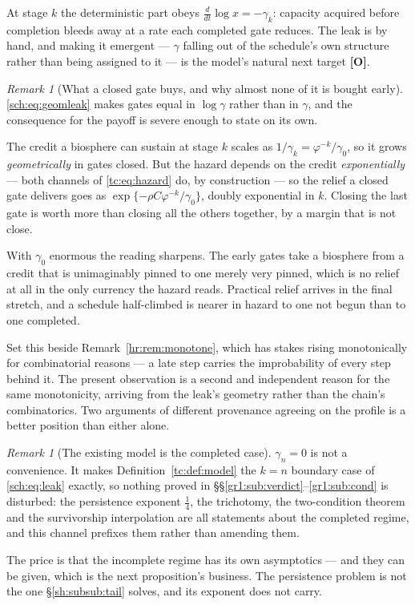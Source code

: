 \documentclass[11pt]{article}
\numberwithin{equation}{section}
\theoremstyle{plain}
\theoremstyle{definition}
\theoremstyle{remark}
\newtheorem{remark}[theorem]{Remark}
\begin{document}
At stage $k$ the deterministic part obeys $\tfrac{d}{dt}\log x=-\gamma_k$:
capacity acquired before completion bleeds away at a rate each completed
gate reduces. The leak is by hand, and making it emergent --- $\gamma$
falling out of the schedule's own structure rather than being assigned
to it --- is the model's natural next target \textbf{[O]}.

\begin{remark}[What a closed gate buys, and why almost none of it is
bought early]\label{sch:rem:backloaded}
\eqref{sch:eq:geomleak} makes gates equal in $\log\gamma$ rather than in
$\gamma$, and the consequence for the payoff is severe enough to state
on its own.

The credit a biosphere can sustain at stage $k$ scales as
$1/\gamma_k=\varphi^{-k}/\gamma_0$, so it grows \emph{geometrically} in
gates closed. But the hazard depends on the credit \emph{exponentially}
--- both channels of \eqref{tc:eq:hazard} do, by construction --- so the
relief a closed gate delivers goes as
$\exp\{-\rho C\varphi^{-k}/\gamma_0\}$, doubly exponential in $k$.
Closing the last gate is worth more than closing all the others
together, by a margin that is not close.

With $\gamma_0$ enormous the reading sharpens. The early gates take a
biosphere from a credit that is unimaginably pinned to one merely very
pinned, which is no relief at all in the only currency the hazard reads.
Practical relief arrives in the final stretch, and a schedule
half-climbed is nearer in hazard to one not begun than to one completed.

Set this beside Remark~\ref{hr:rem:monotone}, which has stakes rising
monotonically for combinatorial reasons --- a late step carries the
improbability of every step behind it. The present observation is a
second and independent reason for the same monotonicity, arriving from
the leak's geometry rather than the chain's combinatorics. Two arguments
of different provenance agreeing on the profile is a better position
than either alone.
\end{remark}

\begin{remark}[The existing model is the completed case]
\label{sch:rem:limit}
$\gamma_n=0$ is not a convenience. It makes
Definition~\ref{tc:def:model} the $k=n$ boundary case of
\eqref{sch:eq:leak} exactly, so nothing proved in
\S\S\ref{gr1:sub:verdict}--\ref{gr1:sub:cond} is disturbed: the
persistence exponent $\tfrac14$, the trichotomy, the two-condition
theorem and the survivorship interpolation are all statements about the
completed regime, and this channel prefixes them rather than amending
them.

The price is that the incomplete regime has its own asymptotics --- and
they can be given, which is the next proposition's business. The
persistence problem is not the one \S\ref{sh:subsub:tail} solves, and
its exponent does not carry.
\end{remark}
\end{document}
